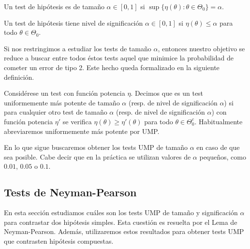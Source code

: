         \begin{definition}
            Un test de hipótesis es de tamaño $\alpha \in [0,1]$ si $\sup\{\eta(\theta): \theta \in \Theta_0\} = \alpha$.
        \end{definition}

        \begin{definition}
            Un test de hipótesis tiene nivel de significación $\alpha \in [0,1]$ si $\eta(\theta) \le \alpha$ para todo $\theta \in \Theta_0$.
        \end{definition}

        Si nos restringimos a estudiar los tests de tamaño $\alpha$, entonces nuestro objetivo se reduce a buscar entre todos éstos tests aquel que minimice la probabilidad de cometer un error de tipo 2. Este hecho queda formalizado en la siguiente definición.

        \begin{definition}
            Considérese un test con función potencia $\eta$. Decimos que es un test uniformemente más potente de tamaño $\alpha$ (resp. de nivel de significación $\alpha$)  si para cualquier otro test de tamaño $\alpha$ (resp. de nivel de significación $\alpha$) con función potencia $\eta'$ se verifica $\eta(\theta) \ge \eta'(\theta)$ para todo $\theta \in \Theta_0^c$. Habitualmente abreviaremos uniformemente más potente por UMP.
        \end{definition}

        En lo que sigue buscaremos obtener los tests UMP de tamaño $\alpha$ en caso de que sea posible. Cabe decir que en la práctica se utilizan valores de $\alpha$ pequeños, como $0.01$, $0.05$ o $0.1$.

    \subsection{Tests de Neyman-Pearson}

        En esta sección estudiamos cuáles son los tests UMP de tamaño y significación $\alpha$ para contrastar dos hipótesis simples. Esta cuestión es resuelta por el Lema de Neyman-Pearson. Además, utilizaremos estos resultados para obtener tests UMP que contrasten hipótesis compuestas.

